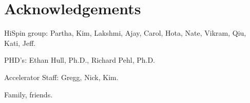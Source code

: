\chapter*{Acknowledgements}
\label{ch:acknowledgement}

\par
\hspace*{0.3cm} HiSpin group: Partha, Kim, Lakshmi, Ajay, Carol, Hota, Nate, Vikram, Qiu, Kati, Jeff. 

PHD's: Ethan Hull, Ph.D., Richard Pehl, Ph.D.

Accelerator Staff: Gregg, Nick, Kim.

Family, friends.






